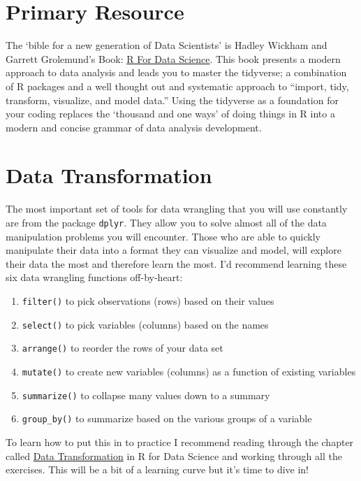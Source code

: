 \documentclass[]{book}
\providecommand{\tightlist}{%
  \setlength{\itemsep}{0pt}\setlength{\parskip}{0pt}}
\begin{document}
\section{Primary Resource}\label{primary-resource}

The `bible for a new generation of Data Scientists' is Hadley Wickham
and Garrett Grolemund's Book: \href{http://r4ds.had.co.nz/}{R For Data
Science}. This book presents a modern approach to data analysis and
leads you to master the tidyverse; a combination of R packages and a
well thought out and systematic approach to ``import, tidy, transform,
visualize, and model data.'' Using the tidyverse as a foundation for
your coding replaces the `thousand and one ways' of doing things in R
into a modern and concise grammar of data analysis development.

\section{Data Transformation}\label{data-transformation}

The most important set of tools for data wrangling that you will use
constantly are from the package \texttt{dplyr}. They allow you to solve
almost all of the data manipulation problems you will encounter. Those
who are able to quickly manipulate their data into a format they can
visualize and model, will explore their data the most and therefore
learn the most. I'd recommend learning these six data wrangling
functions off-by-heart:

\begin{enumerate}
\def\labelenumi{\arabic{enumi})}
\tightlist
\item
  \texttt{filter()} to pick observations (rows) based on their values
\item
  \texttt{select()} to pick variables (columns) based on the names
\item
  \texttt{arrange()} to reorder the rows of your data set
\item
  \texttt{mutate()} to create new variables (columns) as a function of
  existing variables
\item
  \texttt{summarize()} to collapse many values down to a summary
\item
  \texttt{group\_by()} to summarize based on the various groups of a
  variable
\end{enumerate}

To learn how to put this in to practice I recommend reading through the
chapter called \href{http://r4ds.had.co.nz/transform.html}{Data
Transformation} in R for Data Science and working through all the
exercises. This will be a bit of a learning curve but it's time to dive
in!
\end{document}
